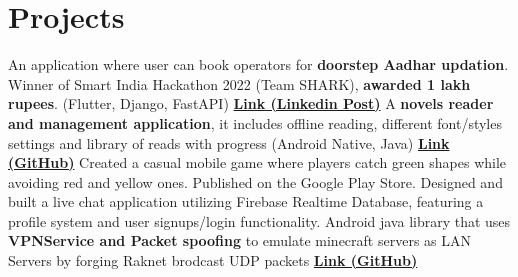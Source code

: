 \section{Projects}
  \resumeSubHeadingListStart
      {An application where user can book operators for \textbf{doorstep Aadhar updation}. Winner of Smart India Hackathon 2022 (Team SHARK), \textbf{awarded 1 lakh rupees}. (Flutter, Django, FastAPI) \href{https://www.linkedin.com/posts/hsk4link_sih-sih2022-smartindiahackathon-activity-6970324738409672704-YcQA/}{\textbf{Link (Linkedin Post)}}}
      {A \textbf{novels reader and management application}, it includes offline reading, different font/styles settings and library of reads with progress (Android Native, Java) \href{https://github.com/hari01584/NovelNation}{\textbf{Link (GitHub)}}}
      {Created a casual mobile game where players catch green shapes while avoiding red and yellow ones. Published on the Google Play Store.}
      {Designed and built a live chat application utilizing Firebase Realtime Database, featuring a profile system and user signups/login functionality.}
      {Android java library that uses \textbf{VPNService and Packet spoofing} to emulate minecraft servers as LAN Servers by forging Raknet brodcast UDP packets \href{https://github.com/hari01584/libMcServerProxy}{\textbf{Link (GitHub)}}}
  \resumeSubHeadingListEnd